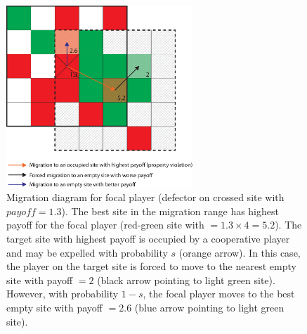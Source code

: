 \begin{figure}[h!]
\begin{center}
\centerline{\includegraphics[width=7cm]{../figures2/migration_diagram.eps}}
\caption{Migration diagram for focal player (defector on crossed site with $payoff = 1.3$). The best site in the migration range has highest payoff for the focal player (red-green site with $ = 1.3 \times 4 = 5.2$). The target site with highest payoff is occupied by a cooperative player and may be expelled with probability $s$ (orange arrow). In this case, the player on the target site is forced to move to the nearest empty site with payoff $= 2$ (black arrow pointing to light green site). However, with probability $1-s$, the focal player moves to the best empty site with payoff $=2.6$ (blue arrow pointing to light green site).}
\label{fig:migration_diagram}
\end{center}
\end{figure}




